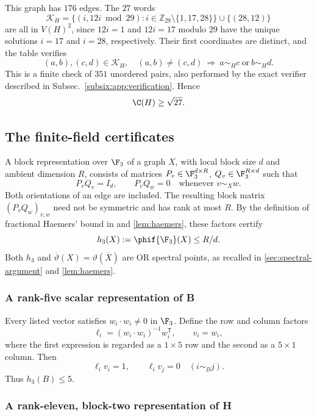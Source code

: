 This graph has \(176\) edges. The \(27\) words
\[
 \mathcal K_H=\{(i,12i\bmod29):i\in\mathbb Z_{29}\setminus\{1,17,28\}\}
 \cup\{(28,12)\}
\]
are all in \(V(H)^2\), since \(12i=1\) and \(12i=17\) modulo \(29\)
have the unique solutions \(i=17\) and \(i=28\), respectively.
Their first coordinates are distinct, and the table verifies
\[
 (a,b),(c,d)\in\mathcal K_H,\quad(a,b)\ne(c,d)
 \ \Longrightarrow\
 a\sim_Hc\ \text{or}\ b\sim_Hd.
\]
This is a finite check of \(351\) unordered pairs, also performed by
the exact verifier described in Subsec.~\ref{subsix:app:verification}.
Hence
\begin{equation}\label{subsix:eq:Hlower}
 \C(H)\geq\sqrt{27}.
\end{equation}

\subsection{The finite-field certificates}\label{subsix:sec:rank}

A block representation over $\F_3$ of a graph \(X\), with local block size \(d\)
and ambient dimension \(R\), consists of matrices
\(P_v\in\F_3^{d\times R}\), \(Q_v\in\F_3^{R\times d}\) such that
\[
 P_vQ_v=I_d,\qquad P_vQ_w=0\quad\text{whenever }v\sim_Xw.
\]
Both orientations of an edge are included. The resulting block matrix
$(P_vQ_w)_{v,w}$ need not be symmetric and has rank at most $R$.
By the definition of fractional Haemers' bound in
 and \cref{lem:haemers}, these factors certify
\[
 h_3(X):=\phif{\F_3}(X)\le R/d.
\]
Both $h_3$ and $\overline\vartheta(X)=\vartheta(\overline X)$ are OR
spectral points, as recalled in \cref{sec:spectral-argument} and
\cref{lem:haemers}.

\subsubsection{A rank-five scalar representation of B}

Every listed vector satisfies \(w_i\cdot w_i\ne0\) in \(\F_3\).
Define the row and column factors
\[
 \ell_i=(w_i\cdot w_i)^{-1}w_i^{\mathsf T},
 \qquad v_i=w_i,
\]
where the first expression is regarded as a \(1\times5\) row and
the second as a \(5\times1\) column. Then
\[
 \ell_i v_i=1,\qquad \ell_i v_j=0\quad(i\sim_Bj).
\]
Thus $h_3(B)\le5$.

\subsubsection{A rank-eleven, block-two representation of H}

